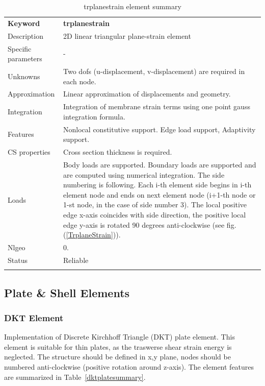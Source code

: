 \documentclass[a4paper]{article}
\newcommand{\param}[1]{\texttt{#1}} %
\newcommand{\templabel}{}%
\newcommand{\tempcaption}{}%
\newcounter{nelpar}
\newenvironment{elementsummary}[5]{%
  \gdef\tempcaption{#4}%
  \gdef\templabel{#5}%
  \setcounter{nelpar}{0}%
  \begin{center} %
    \begin{table}[!htb] %
      \begin{tabular}{|l|p{9cm}|}\hline %
        {\bf Keyword} & \bf{#1}\\ %
        {Description} & {#2}\\ %
        {Specific parameters} & {#3}\\ \hline %
}{
  \\ \hline %
      \end{tabular}%
      \caption{\tempcaption}%
      \label{\templabel}%
    \end{table}%
  \end{center}%
}
\newcommand{\elementParam}[1]{%
  \ifthenelse{\value{nelpar}>0} %
             {&{#1}}%
             {\setcounter{nelpar}{1}Parameters&{#1}}%
             \\%
}
\newcommand{\elementDescription}[2]{{#1} & {#2}\\}
\begin{document}
\begin{elementsummary}{trplanestrain}{2D linear triangular plane-strain element}{-}{trplanestrain element summary}{trplanestrainsummary}
\elementDescription{Unknowns}{Two dofs (u-displacement, v-displacement) are required in each node.}
\elementDescription{Approximation}{Linear approximation of displacements and geometry.}
\elementDescription{Integration}{Integration of membrane strain terms using one point gauss integration formula.}
\elementDescription{Features}{Nonlocal constitutive support. Edge load support, Adaptivity support.}
\elementDescription{CS properties}{Cross section thickness is required.}
\elementDescription{Loads}{Body loads are supported. Boundary loads are supported and are computed  using numerical integration. The side numbering is following.
Each i-th element side begins in i-th element node and ends on next element node (i+1-th node or 1-st node, in the case of side number 3).
The local positive edge x-axis coincides with side direction, the positive local edge y-axis is rotated 90 degrees anti-clockwise (see fig. (\ref{TrplaneStrain})).}
\elementDescription{Nlgeo}{0.}
\elementDescription{Status}{Reliable}
\end{elementsummary}




\clearpage
\subsection{Plate \& Shell Elements}


\subsubsection {DKT Element}
\label{dkt}
Implementation of Discrete Kirchhoff Triangle (DKT) plate element.
This element is suitable for thin plates, as the traswerse shear strain energy is neglected.
The structure should be defined in x,y plane, nodes should be numbered anti-clockwise (positive rotation around
z-axis). The element features are summarized in Table~\ref{dktplatesummary}.
\end{document}
